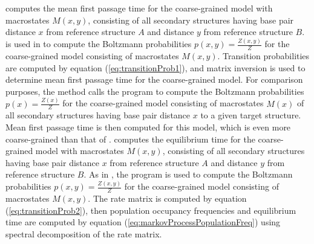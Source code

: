 \fftmfpt computes the mean first passage time
for the coarse-grained model with macrostates $M(x,y)$, consisting of
all secondary structures having base pair distance $x$ from reference
structure $A$ and distance $y$ from reference structure $B$.
\ffttwo is used in \hermes to compute the Boltzmann probabilities
$p(x,y) = \frac{Z(x,y)}{Z}$ for the coarse-grained model consisting of
macrostates $M(x,y)$. Transition probabilities are computed by
equation (\ref{eq:transitionProb1}), and matrix inversion is used to
determine mean first passage time for the coarse-grained model.
For comparison purposes, the method \fftbor calls the
program \fftbor \cite{Senter.po12} to compute the Boltzmann probabilities
$p(x) = \frac{Z(x)}{Z}$ for the coarse-grained model consisting of
macrostates $M(x)$ of all secondary structures having base pair distance
$x$ to a given target structure. Mean first passage time is then computed
for this model, which is even more coarse-grained than that of \fftmfpt.
\ffteq computes the equilibrium time
for the coarse-grained model with macrostates $M(x,y)$, consisting of
all secondary structures having base pair distance $x$ from reference
structure $A$ and distance $y$ from reference structure $B$. As in
\fftmfpt, the program
\ffttwo is used to compute the Boltzmann probabilities
$p(x,y) = \frac{Z(x,y)}{Z}$ for the coarse-grained model consisting of
macrostates $M(x,y)$. The rate matrix is computed by
equation (\ref{eq:transitionProb2}), then population occupancy
frequencies and equilibrium time
are computed by equation (\ref{eq:markovProcessPopulationFreq})
using spectral decomposition of the rate matrix.


